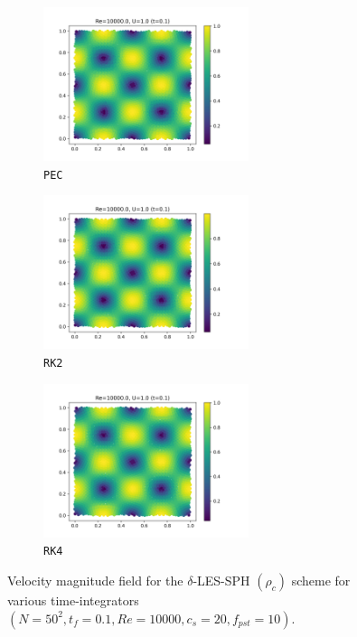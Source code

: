 \begin{figure}[htbp!]
  \begin{subfigure}{7cm}
    \centering\includegraphics[width=6cm]{Code-Figures/deltales/integrator/c0_20_tait_pec_dtmul_1_nx_50_pst_10_re_10000_deltales/final_vmag.png}
    \caption{\texttt{PEC}}
  \end{subfigure}
  \begin{subfigure}{7cm}
    \centering\includegraphics[width=6cm]{Code-Figures/deltales/integrator/c0_20_tait_rk2_dtmul_1.5_nx_50_pst_10_re_10000_deltales/final_vmag.png}
    \caption{\texttt{RK2}}
  \end{subfigure}
  \begin{subfigure}{7cm}
    \centering\includegraphics[width=6cm]{Code-Figures/deltales/integrator/c0_20_tait_rk4_dtmul_2_nx_50_pst_10_re_10000_deltales/final_vmag.png}
    \caption{\texttt{RK4}}
  \end{subfigure}
  \caption{Velocity magnitude field for the $\delta$-LES-SPH $(\rho_c)$ scheme for various time-integrators $(N=50^2, t_f=0.1, Re=10000, c_s=20, f_{pst}=10)$.}
  \label{fig:deltales-integrator-vmag}
\end{figure}

